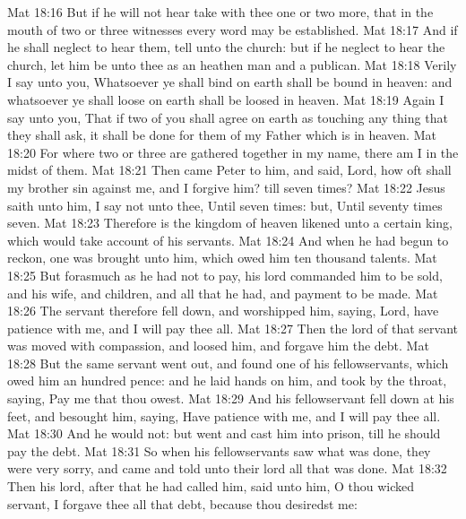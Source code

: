 \vs Mat 18:16 But if he will not hear  take with thee one or two more, that in the mouth of two or three witnesses every word may be established.
\vs Mat 18:17 And if he shall neglect to hear them, tell  unto the church: but if he neglect to hear the church, let him be unto thee as an heathen man and a publican.
\vs Mat 18:18 Verily I say unto you, Whatsoever ye shall bind on earth shall be bound in heaven: and whatsoever ye shall loose on earth shall be loosed in heaven.
\vs Mat 18:19 Again I say unto you, That if two of you shall agree on earth as touching any thing that they shall ask, it shall be done for them of my Father which is in heaven.
\vs Mat 18:20 For where two or three are gathered together in my name, there am I in the midst of them.
\vs Mat 18:21 Then came Peter to him, and said, Lord, how oft shall my brother sin against me, and I forgive him? till seven times?
\vs Mat 18:22 Jesus saith unto him, I say not unto thee, Until seven times: but, Until seventy times seven.
\vs Mat 18:23 Therefore is the kingdom of heaven likened unto a certain king, which would take account of his servants.
\vs Mat 18:24 And when he had begun to reckon, one was brought unto him, which owed him ten thousand talents.
\vs Mat 18:25 But forasmuch as he had not to pay, his lord commanded him to be sold, and his wife, and children, and all that he had, and payment to be made.
\vs Mat 18:26 The servant therefore fell down, and worshipped him, saying, Lord, have patience with me, and I will pay thee all.
\vs Mat 18:27 Then the lord of that servant was moved with compassion, and loosed him, and forgave him the debt.
\vs Mat 18:28 But the same servant went out, and found one of his fellowservants, which owed him an hundred pence: and he laid hands on him, and took  by the throat, saying, Pay me that thou owest.
\vs Mat 18:29 And his fellowservant fell down at his feet, and besought him, saying, Have patience with me, and I will pay thee all.
\vs Mat 18:30 And he would not: but went and cast him into prison, till he should pay the debt.
\vs Mat 18:31 So when his fellowservants saw what was done, they were very sorry, and came and told unto their lord all that was done.
\vs Mat 18:32 Then his lord, after that he had called him, said unto him, O thou wicked servant, I forgave thee all that debt, because thou desiredst me:
